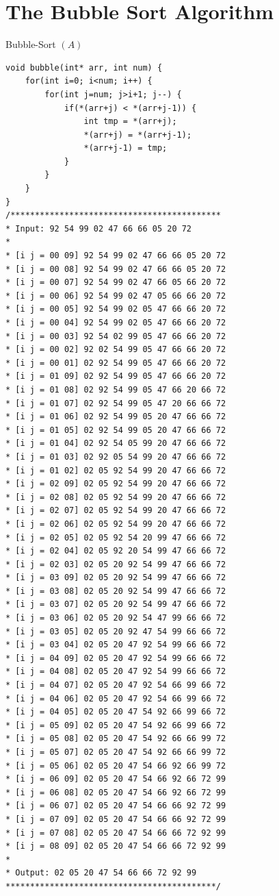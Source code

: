 \documentclass[12pt,openany]{book}
\theoremstyle{definition}
\begin{document}
	\newpage
	\section{The Bubble Sort Algorithm}
	\begin{algorithm}[H]
		\caption{Bubble-Sort $(A)$}
		\BlankLine
		\BlankLine
	\end{algorithm}
	
	\begin{lstlisting}[style=C]
void bubble(int* arr, int num) {
	for(int i=0; i<num; i++) {
		for(int j=num; j>i+1; j--) {
			if(*(arr+j) < *(arr+j-1)) {
				int tmp = *(arr+j);
				*(arr+j) = *(arr+j-1);
				*(arr+j-1) = tmp;
			}
		}
	}
}
/*******************************************
* Input: 92 54 99 02 47 66 66 05 20 72 
* 
* [i j = 00 09] 92 54 99 02 47 66 66 05 20 72 
* [i j = 00 08] 92 54 99 02 47 66 66 05 20 72 
* [i j = 00 07] 92 54 99 02 47 66 05 66 20 72 
* [i j = 00 06] 92 54 99 02 47 05 66 66 20 72 
* [i j = 00 05] 92 54 99 02 05 47 66 66 20 72 
* [i j = 00 04] 92 54 99 02 05 47 66 66 20 72 
* [i j = 00 03] 92 54 02 99 05 47 66 66 20 72 
* [i j = 00 02] 92 02 54 99 05 47 66 66 20 72 
* [i j = 00 01] 02 92 54 99 05 47 66 66 20 72 
* [i j = 01 09] 02 92 54 99 05 47 66 66 20 72 
* [i j = 01 08] 02 92 54 99 05 47 66 20 66 72 
* [i j = 01 07] 02 92 54 99 05 47 20 66 66 72 
* [i j = 01 06] 02 92 54 99 05 20 47 66 66 72 
* [i j = 01 05] 02 92 54 99 05 20 47 66 66 72 
* [i j = 01 04] 02 92 54 05 99 20 47 66 66 72 
* [i j = 01 03] 02 92 05 54 99 20 47 66 66 72 
* [i j = 01 02] 02 05 92 54 99 20 47 66 66 72 
* [i j = 02 09] 02 05 92 54 99 20 47 66 66 72 
* [i j = 02 08] 02 05 92 54 99 20 47 66 66 72 
* [i j = 02 07] 02 05 92 54 99 20 47 66 66 72 
* [i j = 02 06] 02 05 92 54 99 20 47 66 66 72 
* [i j = 02 05] 02 05 92 54 20 99 47 66 66 72 
* [i j = 02 04] 02 05 92 20 54 99 47 66 66 72 
* [i j = 02 03] 02 05 20 92 54 99 47 66 66 72 
* [i j = 03 09] 02 05 20 92 54 99 47 66 66 72 
* [i j = 03 08] 02 05 20 92 54 99 47 66 66 72 
* [i j = 03 07] 02 05 20 92 54 99 47 66 66 72 
* [i j = 03 06] 02 05 20 92 54 47 99 66 66 72 
* [i j = 03 05] 02 05 20 92 47 54 99 66 66 72 
* [i j = 03 04] 02 05 20 47 92 54 99 66 66 72 
* [i j = 04 09] 02 05 20 47 92 54 99 66 66 72 
* [i j = 04 08] 02 05 20 47 92 54 99 66 66 72 
* [i j = 04 07] 02 05 20 47 92 54 66 99 66 72 
* [i j = 04 06] 02 05 20 47 92 54 66 99 66 72 
* [i j = 04 05] 02 05 20 47 54 92 66 99 66 72 
* [i j = 05 09] 02 05 20 47 54 92 66 99 66 72 
* [i j = 05 08] 02 05 20 47 54 92 66 66 99 72 
* [i j = 05 07] 02 05 20 47 54 92 66 66 99 72 
* [i j = 05 06] 02 05 20 47 54 66 92 66 99 72 
* [i j = 06 09] 02 05 20 47 54 66 92 66 72 99 
* [i j = 06 08] 02 05 20 47 54 66 92 66 72 99 
* [i j = 06 07] 02 05 20 47 54 66 66 92 72 99 
* [i j = 07 09] 02 05 20 47 54 66 66 92 72 99 
* [i j = 07 08] 02 05 20 47 54 66 66 72 92 99 
* [i j = 08 09] 02 05 20 47 54 66 66 72 92 99 
* 
* Output: 02 05 20 47 54 66 66 72 92 99 
*******************************************/
	\end{lstlisting}
	
\end{document}
